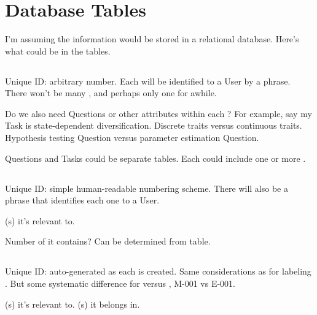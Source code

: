 \section{Database Tables}

I'm assuming the information would be stored in a relational database.
Here's what could be in the tables.

\subsection{\Task}

Unique ID: arbitrary number.
Each \Task will be identified to a User by a phrase.
There won't be many \Tasks, and perhaps only one for awhile.

Do we also need Questions or other attributes within each \Task?
For example, say my Task is state-dependent diversification.
Discrete traits versus continuous traits.
Hypothesis testing Question versus parameter estimation Question.

Questions and Tasks could be separate tables.
Each \Task could include one or more \Question.

\subsection{\Refset}

Unique ID: simple human-readable numbering scheme.
There will also be a phrase that identifies each one to a User.

\Task(s) it's relevant to.

Number of \Elements it contains?  Can be determined from \Elements table.

\subsection{\Element}

Unique ID: auto-generated as each \Element is created.
Same considerations as for labeling \Methods.
But some systematic difference for \Method versus \Element, \eg M-001 vs E-001.

\Task(s) it's relevant to.
\Refset(s) it belongs in.

